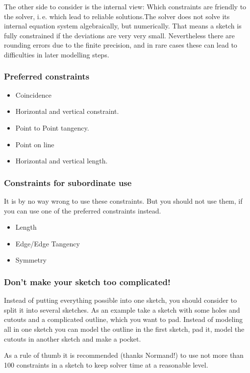 \documentclass[12pt,titlepage]{article}
\begin{document}
\begin {itemize}
The other side to consider is the internal view: Which constraints are
friendly to the solver, i.\,e. which lead to reliable solutions.The solver
does not solve its internal equation system algebraically, but numerically.
That means a sketch is fully constrained if the deviations are very very
small. Nevertheless there are rounding errors due to the finite precision, and
in rare cases these can lead to difficulties in later modelling steps.
 
\subsubsection*{Preferred constraints}
\begin{itemize}
\item Coincidence
\item Horizontal and vertical constraint.
\item Point to Point tangency.
\item Point on line
\item Horizontal and vertical length.
\end{itemize}

\subsubsection*{Constraints for subordinate use}
It is by no way wrong to use these constraints. But you should not use them, if
you can use one of the preferred constraints instead.
\begin{itemize}
\item Length
\item Edge/Edge Tangency
\item Symmetry 
\end{itemize}

\subsubsection*{Don't make your sketch too complicated!}
Instead of putting everything possible into one sketch, you should consider to split it into
several sketches. As an example take a sketch with some holes and cutouts and a complicated
outline, which you want to pad. Instead of modeling all in one sketch you can model
the outline in the first sketch, pad it, model the cutouts in another sketch and
make a pocket.

As a rule of thumb it is recommended (thanks Normand!) to use not more than 100 constraints in
a sketch to keep solver time at a reasonable level.


\end{itemize}
\end{document}
